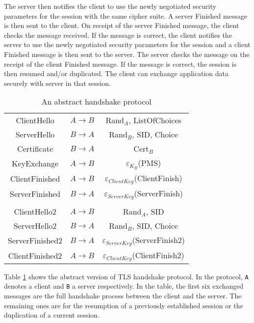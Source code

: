 \documentclass[a4paper,fleqn]{cas-dc}
\begin{document}
The server then notifies the client to use the newly negotiated security parameters for the session with the same cipher suite. A server Finished message is then sent to the client. On receipt of the server Finished message, the client checks the message received. If the message is correct, the client notifies the server to use the newly negotiated security parameters for the session and a client Finished message is then sent to the server. The server checks the message on the receipt of the client Finished message. If the message is correct, the session is then resumed and/or duplicated. The client can exchange application data securely with server in that session.
\noindent
\begin{table}[]
\centering
    \begin{tabular}{ c c c }
    ClientHello & $A \rightarrow B$  & Rand$_A$, ListOfChoices \\ 
    ServerHello & $B \rightarrow A$ & Rand$_B$, SID, Choice \\  
    Certificate & $B \rightarrow A$ & Cert$_B$ \\ 
    KeyExchange & $A \rightarrow B$ & $\varepsilon_{K_B}$(PMS) \\ 
    ClientFinished & $A \rightarrow B$ & $\varepsilon_{ClientKey}$(ClientFinish) \\
   ServerFinished & $B \rightarrow A$ & $\varepsilon_{ServerKey}$(ServerFinish) \\
   \\
   ClientHello2 & $A \rightarrow B$  & Rand$_A$, SID \\
   ServerHello2 & $B \rightarrow A$ & Rand$_B$, SID, Choice \\
   ServerFinished2 & $B \rightarrow A$ & $\varepsilon_{ServerKey}$(ServerFinish2) \\
   ClientFinished2 & $A \rightarrow B$ & $\varepsilon_{ClientKey}$(ClientFinish2) \\
    \end{tabular}
     \caption{An abstract handshake protocol}
   
    \label{tab:tb2}
\end{table}
\noindent
Table \ref{tab:tb2} shows the abstract version of TLS handshake protocol. In the protocol, \verb!A! denotes a client and \verb!B! a server respectively. In the table, the first six exchanged messages are the full handshake process between the client and the server. The remaining ones are for the resumption of a previously established session or the duplication of a current session.
\end{document}
